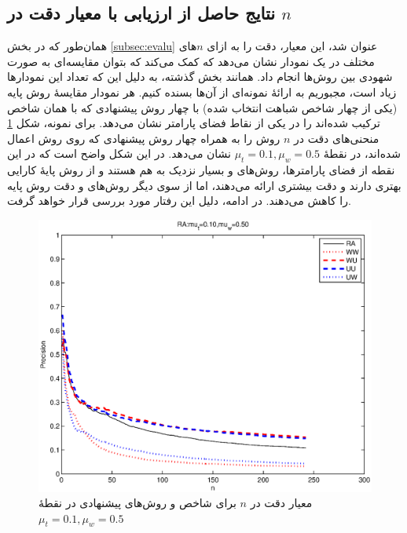 \subsection{نتایج حاصل از ارزیابی با معیار دقت در $n$}
همان‌طور که در بخش \ref{subsec:evalu} عنوان شد، این معیار، دقت را به ازای $n$های مختلف در یک نمودار نشان می‌دهد که کمک می‌کند که بتوان مقایسه‌ای به صورت شهودی بین روش‌ها انجام داد. همانند بخش گذشته، به دلیل این که تعداد این نمودارها زیاد است، مجبوریم به ارائهٔ نمونه‌ای از آن‌ها بسنده کنیم. هر نمودار مقایسهٔ روش پایه (یکی از چهار شاخص شباهت انتخاب شده) با چهار روش پیشنهادی که با همان شاخص ترکیب شده‌اند را در یکی از نقاط فضای پارامتر نشان می‌دهد.
برای نمونه، شکل \ref{fig:RAmut01muw05} منحنی‌های دقت در $n$ روش  را به همراه چهار روش پیشنهادی که روی روش  اعمال شده‌اند، در نقطهٔ $\mu_t=0.1,\mu_w=0.5$ نشان می‌دهد. در این شکل واضح است که در این نقطه از فضای پارامترها، روش‌های  و  بسیار نزدیک به هم هستند و از روش پایهٔ  کارایی بهتری دارند و دقت بیشتری ارائه می‌دهند، اما از سوی دیگر روش‌های  و  دقت روش پایه را کاهش می‌دهند. در ادامه، دلیل این رفتار مورد بررسی قرار خواهد گرفت.
\begin{figure}[!htb]
  \begin{center}
    \includegraphics[width=12cm]{RAmut01muw05.eps}
    \caption{معیار دقت در $n$ برای شاخص  و روش‌های پیشنهادی در نقطهٔ $\mu_t=0.1,\mu_w=0.5$}
    \label{fig:RAmut01muw05}
  \end{center}
\end{figure}

